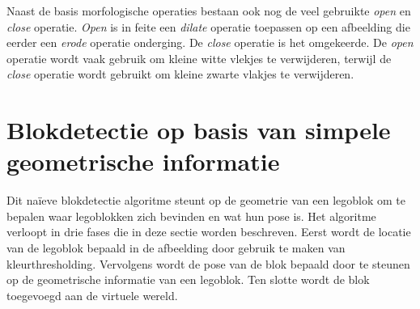 Naast de basis morfologische operaties bestaan ook nog de veel gebruikte \textit{open} en \textit{close} operatie. \textit{Open} is in feite een \textit{dilate} operatie toepassen op een afbeelding die eerder een \textit{erode} operatie onderging. De \textit{close} operatie is het omgekeerde. De \textit{open} operatie wordt vaak gebruik om kleine witte vlekjes te verwijderen, terwijl de \textit{close} operatie wordt gebruikt om kleine zwarte vlakjes te verwijderen.

\section{Blokdetectie op basis van simpele geometrische informatie} \label{sec:naive_algo}
Dit na\"ieve blokdetectie algoritme steunt op de geometrie van een legoblok om te bepalen waar legoblokken zich bevinden en wat hun pose is. Het algoritme verloopt in drie fases die in deze sectie worden beschreven. Eerst wordt de locatie van de legoblok bepaald in de afbeelding door gebruik te maken van kleurthresholding. Vervolgens wordt de pose van de blok bepaald door te steunen op de geometrische informatie van een legoblok. Ten slotte wordt de blok toegevoegd aan de virtuele wereld.

%

